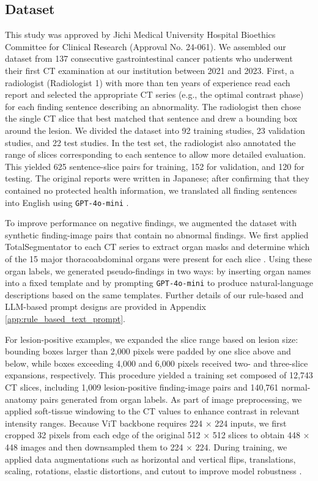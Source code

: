 \documentclass[bioengineering,article,submit,pdftex,moreauthors]{Definitions/mdpi}
\begin{document}
\subsection{Dataset}\label{sec:dataset}
This study was approved by Jichi Medical University Hospital Bioethics Committee for Clinical Research (Approval No. 24-061). 
We assembled our dataset from 137 consecutive gastrointestinal cancer patients who underwent their ﬁrst CT examination at our institution between 2021 and 2023. 
First, a radiologist (Radiologist 1) with more than ten years of experience read each report and selected the appropriate CT series (e.g., the optimal contrast phase) for each finding sentence describing an abnormality. 
The radiologist then chose the single CT slice that best matched that sentence and drew a bounding box around the lesion. 
We divided the dataset into 92 training studies, 23 validation studies, and 22 test studies. 
In the test set, the radiologist also annotated the range of slices corresponding to each sentence to allow more detailed evaluation. 
This yielded 625 sentence-slice pairs for training, 152 for validation, and 120 for testing. 
The original reports were written in Japanese; after confirming that they contained no protected health information, we translated all finding sentences into English using \texttt{GPT-4o-mini} \cite{openai_gpt-4_2024}. 


To improve performance on negative findings, we augmented the dataset with synthetic finding-image pairs that contain no abnormal findings. 
We first applied TotalSegmentator to each CT series to extract organ masks and determine which of the 15 major thoracoabdominal organs were present for each slice \cite{wasserthal_totalsegmentator_2023}. 
Using these organ labels, we generated pseudo-findings in two ways: by inserting organ names into a fixed template and by prompting \texttt{GPT-4o-mini} to produce natural-language descriptions based on the same templates. 
Further details of our rule-based and LLM-based prompt designs are provided in Appendix \ref{app:rule_based_text_prompt}.


For lesion-positive examples, we expanded the slice range based on lesion size: bounding boxes larger than 2,000 pixels were padded by one slice above and below, while boxes exceeding 4,000 and 6,000 pixels received two- and three-slice expansions, respectively. 
This procedure yielded a training set composed of 12,743 CT slices, including 1,009 lesion-positive finding-image pairs and 140,761 normal-anatomy pairs generated from organ labels.
As part of image preprocessing, we applied soft-tissue windowing to the CT values to enhance contrast in relevant intensity ranges. 
Because ViT backbone requires 224 × 224 inputs, we first cropped 32 pixels from each edge of the original 512 × 512 slices to obtain 448 × 448 images and then downsampled them to 224 × 224. 
During training, we applied data augmentations such as horizontal and vertical flips, translations, scaling, rotations, elastic distortions, and cutout to improve model robustness \cite{devries_improved_2017}.
\end{document}
